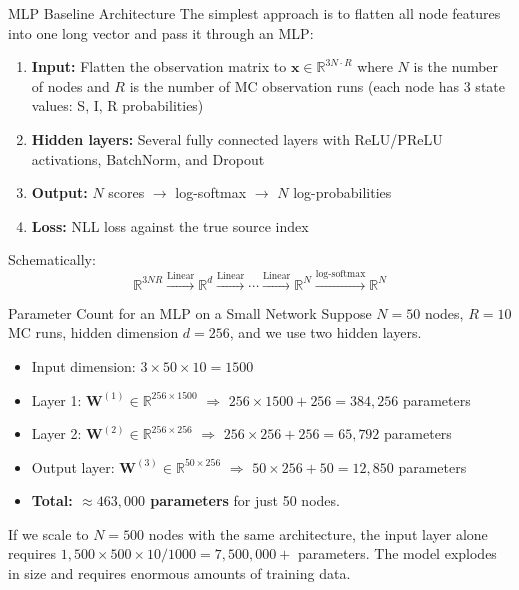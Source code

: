 \begin{conceptbox}{MLP Baseline Architecture}
The simplest approach is to flatten all node features into one long vector and pass it through an MLP:

\begin{enumerate}
    \item \textbf{Input:} Flatten the observation matrix to $\mathbf{x} \in \mathbb{R}^{3N \cdot R}$ where $N$ is the number of nodes and $R$ is the number of MC observation runs (each node has 3 state values: S, I, R probabilities)
    \item \textbf{Hidden layers:} Several fully connected layers with ReLU/PReLU activations, BatchNorm, and Dropout
    \item \textbf{Output:} $N$ scores $\to$ log-softmax $\to$ $N$ log-probabilities
    \item \textbf{Loss:} NLL loss against the true source index
\end{enumerate}

Schematically:
\[
    \mathbb{R}^{3NR} \xrightarrow{\text{Linear}} \mathbb{R}^d \xrightarrow{\text{Linear}} \cdots \xrightarrow{\text{Linear}} \mathbb{R}^N \xrightarrow{\text{log-softmax}} \mathbb{R}^N
\]
\end{conceptbox}

\begin{examplebox}{Parameter Count for an MLP on a Small Network}
Suppose $N = 50$ nodes, $R = 10$ MC runs, hidden dimension $d = 256$, and we use two hidden layers.

\begin{itemize}
    \item Input dimension: $3 \times 50 \times 10 = 1500$
    \item Layer 1: $\mathbf{W}^{(1)} \in \mathbb{R}^{256 \times 1500}$ $\Rightarrow$ $256 \times 1500 + 256 = 384{,}256$ parameters
    \item Layer 2: $\mathbf{W}^{(2)} \in \mathbb{R}^{256 \times 256}$ $\Rightarrow$ $256 \times 256 + 256 = 65{,}792$ parameters
    \item Output layer: $\mathbf{W}^{(3)} \in \mathbb{R}^{50 \times 256}$ $\Rightarrow$ $50 \times 256 + 50 = 12{,}850$ parameters
    \item \textbf{Total: $\approx 463{,}000$ parameters} for just 50 nodes.
\end{itemize}
If we scale to $N = 500$ nodes with the same architecture, the input layer alone requires $1{,}500 \times 500 \times 10 / 1000 = 7{,}500{,}000+$ parameters. The model explodes in size and requires enormous amounts of training data.
\end{examplebox}

